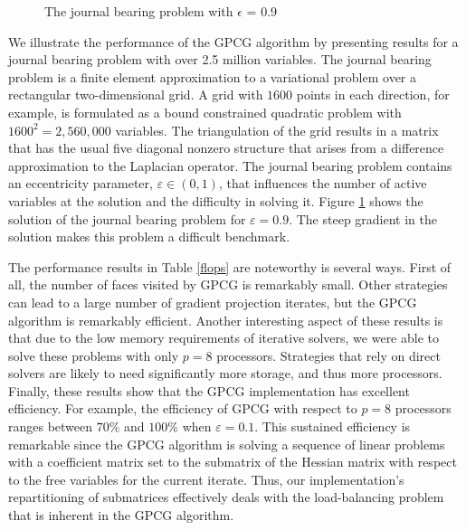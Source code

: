 \begin{figure}[tb]
\centerline{\epsfysize=3.0in }
\caption{The journal bearing problem with $\epsilon$ = 0.9}
\label{dpjb}
\end{figure}



We illustrate the performance of the GPCG algorithm by 
presenting results for a journal bearing problem
with over 2.5 million variables.
The journal bearing problem
is a finite element approximation to a variational problem 
over a rectangular two-dimensional grid.  A
grid with $1600$ points in each direction, for example, is formulated
as a bound constrained quadratic problem with $1600^2=2,560,000$
variables.
The triangulation of the grid results in a matrix that has the
usual five diagonal nonzero structure that arises
from a difference approximation to the Laplacian operator.
The journal bearing problem contains an eccentricity parameter,
$\varepsilon \in (0,1)$, that influences the number of active
variables at the solution and the difficulty in solving it.
Figure \ref{dpjb} shows the solution of the journal bearing problem
for $ \varepsilon = 0.9 $. The steep gradient in the solution
makes this problem a difficult benchmark.

The performance results in Table \ref{flops} are noteworthy is several
ways.  First of all, the number of faces visited by GPCG is remarkably
small.  Other strategies can lead to a large number of gradient
projection iterates, but the GPCG algorithm is remarkably efficient.
Another interesting aspect of these results is that due to the low
memory requirements of iterative solvers, we were able to solve these
problems with only $ p = 8 $ processors.  Strategies that rely on
direct solvers are likely to need significantly more storage, and thus
more processors.  Finally, these results show that the GPCG
implementation has excellent efficiency.  For example, the efficiency
of GPCG with respect to $ p = 8 $ processors ranges between $ 70\% $
and $ 100\% $ when $ \varepsilon = 0.1 $.  This sustained efficiency
is remarkable since the GPCG algorithm is solving a sequence of linear
problems with a coefficient matrix set to the submatrix of the Hessian
matrix with respect to the free variables for the current iterate.
Thus, our implementation's repartitioning of submatrices effectively
deals with the load-balancing problem that is inherent in the GPCG
algorithm.

